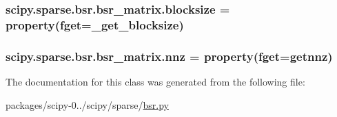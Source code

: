 \subsubsection[{blocksize}]{\setlength{\rightskip}{0pt plus 5cm}scipy.\+sparse.\+bsr.\+bsr\+\_\+matrix.\+blocksize = property(fget=\+\_\+get\+\_\+blocksize)\hspace{0.3cm}{\ttfamily [static]}}\label{classscipy_1_1sparse_1_1bsr_1_1bsr__matrix_a7acef51437e1b95609b71de68fe18ae1}
\hypertarget{classscipy_1_1sparse_1_1bsr_1_1bsr__matrix_a0d58d398fe0ee3cf29ee8e893947025d}{}
\subsubsection[{nnz}]{\setlength{\rightskip}{0pt plus 5cm}scipy.\+sparse.\+bsr.\+bsr\+\_\+matrix.\+nnz = property(fget={\bf getnnz})\hspace{0.3cm}{\ttfamily [static]}}\label{classscipy_1_1sparse_1_1bsr_1_1bsr__matrix_a0d58d398fe0ee3cf29ee8e893947025d}


The documentation for this class was generated from the following file\+:\begin{DoxyCompactItemize}
\item 
packages/scipy-\/0../scipy/sparse/\hyperlink{bsr_8py}{bsr.\+py}\end{DoxyCompactItemize}
